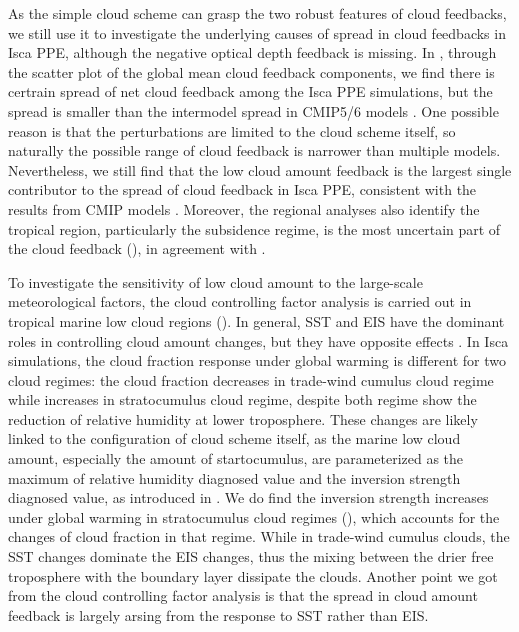As the simple cloud scheme can grasp the two robust features of cloud feedbacks, we still use it to investigate the underlying causes of spread in cloud feedbacks in Isca PPE, although the negative optical depth feedback is missing. In , through the scatter plot of the global mean cloud feedback components, we find there is certrain spread of net cloud feedback among the Isca PPE simulations, but the spread is smaller than the intermodel spread in CMIP5/6 models \citep{Ceppi2017,Zelinka2020causes}. One possible reason is that the perturbations are limited to the cloud scheme itself, so naturally the possible range of cloud feedback is narrower than multiple models. Nevertheless, we still find that the low cloud amount feedback is the largest single contributor to the spread of cloud feedback in Isca PPE, consistent with the results from CMIP models \citep{Zelinka2016insights}. Moreover, the regional analyses also identify the tropical region, particularly the subsidence regime, is the most uncertain part of the cloud feedback (), in agreement with \cite{Bony2005}. 

To investigate the sensitivity of low cloud amount to the large-scale meteorological factors, the cloud controlling factor analysis is carried out in tropical marine low cloud regions (). In general, SST and EIS have the dominant roles in controlling cloud amount changes, but they have opposite effects \citep[e.g.,][]{Qu2014,Qu2015positive,Klein2017low,Scott2020,Cesana2021}. In Isca simulations, the cloud fraction response under global warming is different for two cloud regimes: the cloud fraction decreases in trade-wind cumulus cloud regime while increases in stratocumulus cloud regime, despite both regime show the reduction of relative humidity at lower troposphere. These changes are likely linked to the configuration of cloud scheme itself, as the marine low cloud amount, especially the amount of startocumulus, are parameterized as the maximum of relative humidity diagnosed value and the inversion strength diagnosed value, as introduced in . We do find the inversion strength increases under global warming in stratocumulus cloud regimes (), which accounts for the changes of cloud fraction in that regime. While in trade-wind cumulus clouds, the SST changes dominate the EIS changes, thus the mixing between the drier free troposphere with the boundary layer dissipate the clouds. Another point we got from the cloud controlling factor analysis is that the spread in cloud amount feedback is largely arsing from the response to SST rather than EIS.

